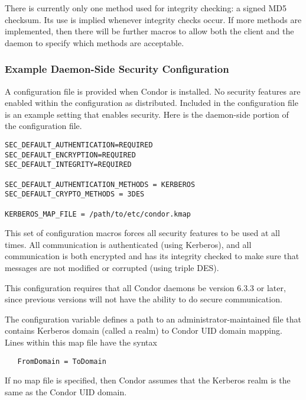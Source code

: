 There is currently only one method used for integrity checking:
a signed MD5 checksum.
Its use is implied whenever integrity checks occur.
If more methods are implemented, then there will be further
macros to allow both the client and the daemon to specify
which methods are acceptable.

\subsubsection{\label{sec:Security-sample1} Example Daemon-Side Security Configuration}

A configuration file is provided when Condor is installed.
No security features are enabled within the configuration as
distributed.
Included in the configuration file is an example setting
that enables security.
Here is the daemon-side portion of the configuration file.

\begin{verbatim}
SEC_DEFAULT_AUTHENTICATION=REQUIRED
SEC_DEFAULT_ENCRYPTION=REQUIRED
SEC_DEFAULT_INTEGRITY=REQUIRED

SEC_DEFAULT_AUTHENTICATION_METHODS = KERBEROS
SEC_DEFAULT_CRYPTO_METHODS = 3DES

KERBEROS_MAP_FILE = /path/to/etc/condor.kmap

\end{verbatim}

This set of configuration macros forces all security features
to be used at all times.
All communication is authenticated (using Kerberos),
and all communication is both encrypted and has its
integrity checked to make sure that messages
are not modified or corrupted (using triple DES).

This configuration requires that all Condor daemons be
version 6.3.3 or later, since previous versions will not have
the ability to do secure communication.

The configuration variable
defines a path to an administrator-maintained file that
contains Kerberos domain (called a realm) to Condor UID domain mapping.
Lines within this map file have the syntax
\begin{verbatim}
   FromDomain = ToDomain
\end{verbatim}
If no map file is specified, then Condor assumes that the
Kerberos realm is the same as the Condor UID domain.


